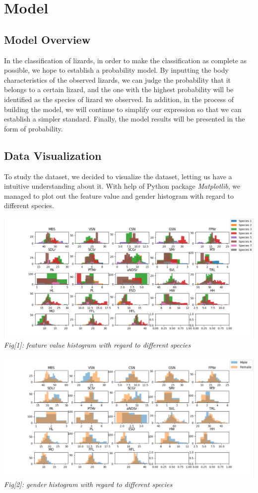 \documentclass[12pt]{article}
\begin{document}
\newpage
\section{Model}
	\subsection{Model Overview}
		In the classification of lizards, in order to make the classification as complete as possible, we hope to establish a probability model. By inputting the body characteristics of the observed lizards, we can judge the probability that it belongs to a certain lizard, and the one with the highest probability will be identified as the species of lizard we observed. In addition, in the process of building the model, we will continue to simplify our expression so that we can establish a simpler standard.  Finally, the model results will be presented in the form of probability.

	\subsection{Data Visualization}
		To study the dataset, we decided to visualize the dataset, letting
		us have a intuitive understanding about it.
		With help of Python package \textit{Matplotlib}, we managed to plot
		out the feature value and gender histogram with regard to different species.
		
		\begin{center}
			\includegraphics[scale=0.44]{fig1} \\
			\textit{Fig[1]: feature value histogram with regard to different species}
		\end{center}
		
		\begin{center}
			\includegraphics[scale=0.22]{fig2} \\
			\textit{Fig[2]: gender histogram with regard to different species}
		\end{center}
		
\end{document}
